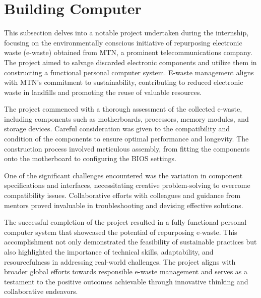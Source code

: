 \section{Building Computer}
This subsection delves into a notable project undertaken during the internship, focusing on the environmentally conscious initiative of repurposing electronic waste (e-waste) obtained from MTN, a prominent telecommunications company. The project aimed to salvage discarded electronic components and utilize them in constructing a functional personal computer system. E-waste management aligns with MTN's commitment to sustainability, contributing to reduced electronic waste in landfills and promoting the reuse of valuable resources.

The project commenced with a thorough assessment of the collected e-waste, including components such as motherboards, processors, memory modules, and storage devices. Careful consideration was given to the compatibility and condition of the components to ensure optimal performance and longevity. The construction process involved meticulous assembly, from fitting the components onto the motherboard to configuring the BIOS settings.

One of the significant challenges encountered was the variation in component specifications and interfaces, necessitating creative problem-solving to overcome compatibility issues. Collaborative efforts with colleagues and guidance from mentors proved invaluable in troubleshooting and devising effective solutions.

The successful completion of the project resulted in a fully functional personal computer system that showcased the potential of repurposing e-waste. This accomplishment not only demonstrated the feasibility of sustainable practices but also highlighted the importance of technical skills, adaptability, and resourcefulness in addressing real-world challenges. The project aligns with broader global efforts towards responsible e-waste management and serves as a testament to the positive outcomes achievable through innovative thinking and collaborative endeavors.
